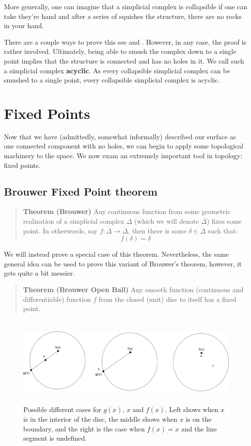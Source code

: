 \documentclass[a4paper]{article}
\newcommand{\ol}{\overline}
\begin{document}
More generally, one can imagine that a simplicial complex is collapsible if one can take they're hand and after a series of squishes the structure, there are no rocks in your hand.

There are a couple ways to prove this see \cite{easy} and \cite{lecs}. However, in any case, the proof is rather involved. Ultimately, being able to smush the complex down to a single point implies that the structure is connected and has no holes in it. We call such a simplicial complex \textbf{acyclic}. As every collapsible simplicial complex can be smushed to a single point, every collapsible simplicial complex is acyclic.

\section{Fixed Points}

Now that we have (admittedly, somewhat informally) described our surface as one connected component with no holes, we can begin to apply some topological machinery to the space. We now exam an extremely important tool in topology: fixed points.

\subsection{Brouwer Fixed Point theorem}

\begin{quote}
    \textbf{Theorem (Brouwer)} Any continuous function from some geometric realization of a simplicial complex $\Delta$ (which we will denote $\ol{\Delta}$) fixes some point. In otherwords, say $f : \ol{\Delta} \to \ol{\Delta}$, then there is some $\delta \in \ol{\Delta}$ such that:
    $$f(\delta) = \delta$$
\end{quote}

We will instead prove a special case of this theorem. Nevertheless, the same general idea can be used to prove this variant of Brouwer's theorem, however, it gets quite a bit messier.

\begin{quote}
    \textbf{Theorem (Brouwer Open Ball)} Any smooth function (continuous and differentiable) function $f$ from the closed (unit) disc to itself has a fixed point.
\end{quote}

\begin{figure}
\includegraphics[height=4.5cm]{fixedpoint}
\centering
\caption{Possible different cases for $g(x)$, $x$ and $f(x)$. Left shows when $x$ is in the interior of the disc, the middle shows when $x$ is on the boundary, and the right is the case when $f(x) = x$ and the line segment is undefined.}
\end{figure}
\end{document}
